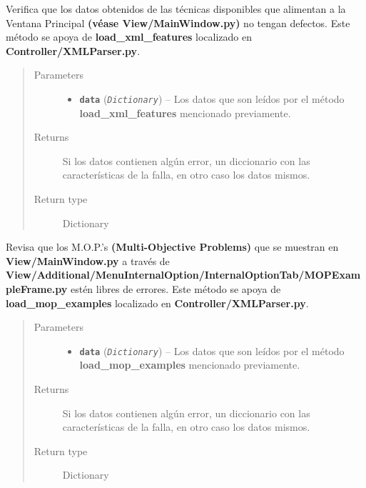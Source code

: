 \documentclass[class=report, crop=false]{standalone}
\begin{document}
\begin{fulllineitems}
\begin{fulllineitems}
\end{fulllineitems}

\begin{fulllineitems}

Verifica que los datos obtenidos de las técnicas disponibles que alimentan 
a la Ventana Principal \textbf{(véase View/MainWindow.py)} no tengan defectos.
Este método se apoya de \textbf{load\_xml\_features} localizado en 
\textbf{Controller/}\break\textbf{XMLParser.py}.

\begin{quote}\begin{description}
\item[{Parameters}] \leavevmode\begin{itemize}
\item \textbf{\texttt{data}} (\emph{\texttt{Dictionary}}) -- Los datos que son leídos por el método \textbf{load\_xml\_features} mencionado previamente.
\end{itemize}
\item[{Returns}] \leavevmode
Si los datos contienen algún error, un diccionario con las características de la falla, en otro caso los datos mismos.
\item[{Return type}] \leavevmode
Dictionary
\end{description}\end{quote}

\end{fulllineitems}

\begin{fulllineitems}

Revisa que los M.O.P.'s \textbf{(Multi-Objective Problems)}
que se muestran en \textbf{View/MainWindow.py} a través de
\textbf{View/Additional/MenuInternalOption/}\break\textbf{InternalOptionTab/MOPExampleFrame.py} 
estén libres de errores.\break
Este método se apoya de \textbf{load\_mop\_examples} localizado en 
\textbf{Controller/}\break\textbf{XMLParser.py}.

\begin{quote}\begin{description}
\item[{Parameters}] \leavevmode\begin{itemize}
\item \textbf{\texttt{data}} (\emph{\texttt{Dictionary}}) -- Los datos que son leídos por el método \textbf{load\_mop\_examples} mencionado previamente.
\end{itemize}
\item[{Returns}] \leavevmode
Si los datos contienen algún error, un diccionario con las características de la falla, en otro caso los datos mismos.
\item[{Return type}] \leavevmode
Dictionary
\end{description}\end{quote}


\end{fulllineitems}
\end{fulllineitems}
\end{document}
